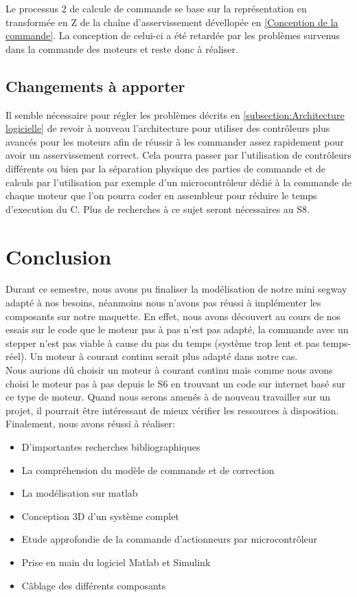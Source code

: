 \documentclass[oneside,a4paper,12pt]{article}
\begin{document}
	Le processus 2 de calcule de commande se base sur la représentation en transformée en Z de la chaîne d'asservissement dévellopée en \ref{Conception de la commande}. La conception de celui-ci a été retardée par les problèmes survenus dans la commande des moteurs et reste donc à réaliser.
	
	\subsection{Changements à apporter}
	
	Il semble nécessaire pour régler les problèmes décrits en \ref{subsection:Architecture logicielle} de revoir à nouveau l'architecture pour utiliser des contrôleurs plus avancés pour les moteurs afin de réussir à les commander assez rapidement pour avoir un asservissement correct. Cela pourra passer par l'utilisation de contrôleurs différents ou bien par la séparation physique des parties de commande et de calculs par l'utilisation par exemple d'un microcontrôleur dédié à la commande de chaque moteur que l'on pourra coder en assembleur pour réduire le temps d'execution du C. Plus de recherches à ce sujet seront nécessaires au S8.
	
	
	\newpage
	
	\section{Conclusion}
	Durant ce semestre, nous avons pu finaliser la modélisation de notre mini segway adapté à nos besoins, néanmoins nous n’avons pas réussi à implémenter les composants sur notre maquette. En effet, nous avons découvert au cours de nos essais sur le code que le moteur pas à pas n’est pas adapté, la commande avec un stepper n’est pas viable à cause du pas du temps (système trop lent et pas temps-réel). Un moteur à courant continu serait plus adapté dans notre cas.\\
	
	Nous aurions dû choisir un moteur à courant continu mais comme nous avons choisi le moteur pas à pas depuis le S6 en trouvant un code sur internet basé sur ce type de moteur.
	Quand nous serons amenés à de nouveau travailler sur un projet, il pourrait être intéressant de mieux vérifier les ressources à disposition.\\
	
	Finalement, nous avons réussi à réaliser:
	\begin{itemize}
		\item D’importantes recherches bibliographiques
		\item La compréhension du modèle de commande et de correction
		\item La modélisation sur matlab
		\item Conception 3D d'un système complet
		\item Etude approfondie de la commande d'actionneurs par microcontrôleur
		\item Prise en main du logiciel Matlab et Simulink
		\item Câblage des différents composants 
	\end{itemize}
\end{document}
